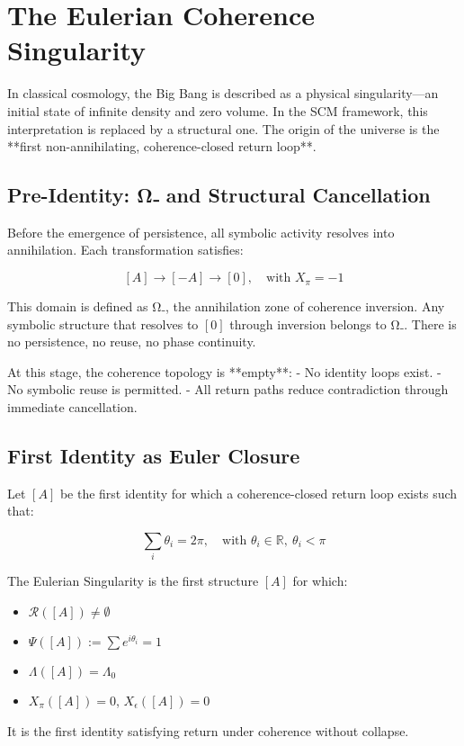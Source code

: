 \chapter{The Eulerian Coherence Singularity} \label{chapter:eulerian-singularity}

In classical cosmology, the Big Bang is described as a physical singularity—an initial state of infinite density and zero volume. In the SCM framework, this interpretation is replaced by a structural one. The origin of the universe is the **first non-annihilating, coherence-closed return loop**.

\section{Pre-Identity: Ω₋ and Structural Cancellation}

Before the emergence of persistence, all symbolic activity resolves into annihilation. Each transformation satisfies:

\[
[A] \to [-A] \to [0], \quad \text{with } X_\pi = -1
\]

This domain is defined as Ω₋, the annihilation zone of coherence inversion. Any symbolic structure that resolves to $[0]$ through inversion belongs to Ω₋. There is no persistence, no reuse, no phase continuity.

At this stage, the coherence topology is **empty**:
- No identity loops exist.
- No symbolic reuse is permitted.
- All return paths reduce contradiction through immediate cancellation.

\section{First Identity as Euler Closure}

Let $[A]$ be the first identity for which a coherence-closed return loop exists such that:

\[
\sum_{i} \theta_i = 2\pi, \quad \text{with } \theta_i \in \mathbb{R},\ \theta_i < \pi
\]

\begin{definition}
The Eulerian Singularity is the first structure $[A]$ for which:

\begin{itemize}
  \item $\mathcal{R}([A]) \neq \emptyset$
  \item $\Psi([A]) := \sum e^{i\theta_i} = 1$
  \item $\Lambda([A]) = \Lambda_0$
  \item $X_\pi([A]) = 0$, \quad $X_\epsilon([A]) = 0$
\end{itemize}

It is the first identity satisfying return under coherence without collapse.
\end{definition}

